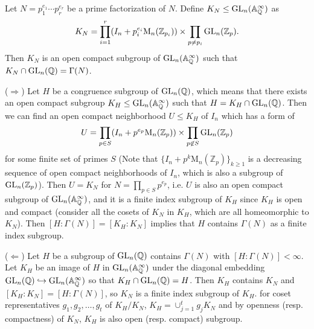 \begin{problem} \notfinish
\end{problem}

\begin{problem}
Let $N = p_{1}^{e_{1}}\cdots p_{r}^{e_r}$ be a prime factorization of $N$. Define $K_N \leq \operatorname{\mathrm{GL}}_{n}(\mathbb{A}_{\mathbb{Q}}^{\infty})$ as
$$
K_N = \prod_{i=1}^{r} (I_{n} + p_{i}^{e_{i}}\mathrm{M}_n(\mathbb{Z}_{p_i})) \times  \prod_{p \neq p_{i}} \operatorname{\mathrm{GL}}_{n}(\mathbb{Z}_p).
$$
Then $K_N$ is an open compact subgroup of $\operatorname{\mathrm{GL}}_{n}(\mathbb{A}_{\mathbb{Q}}^{\infty})$ such that $K_N \cap \operatorname{\mathrm{GL}}_{n}(\mathbb{Q}) = \Gamma(N)$.

($\Rightarrow$) Let $H$ be a congruence subgroup of $\operatorname{\mathrm{GL}}_{n}(\mathbb{Q})$, which means that there exists an open compact subgroup $K_H \leq \operatorname{\mathrm{GL}}_{n}(\mathbb{A}_{\mathbb{Q}}^{\infty})$
such that $H = K_H \cap \operatorname{\mathrm{GL}}_{n}(\mathbb{Q})$.
Then we can find an open compact neighborhood $U \leq K_H$ of $I_n$  which has a form of
$$
U = \prod_{p\in S} (I_n + p^{e_p}\mathrm{M}_n(\mathbb{Z}_p)) \times \prod_{p \not \in S} \operatorname{\mathrm{GL}}_n(\mathbb{Z}_p)
$$
for some finite set of primes $S$ (Note that $\{I_n + p^{k}\mathrm{M}_{n}(\mathbb{Z}_{p})\}_{k\geq 1}$ is a decreasing sequence of open compact neighborhoods of $I_n$, which is also a subgroup of $\operatorname{\mathrm{GL}}_{n}(\mathbb{Z}_p)$).
Then $U = K_N$ for $N = \prod_{p \in S}p^{e_p}$, i.e. $U$ is also an open compact subgroup of $\operatorname{\mathrm{GL}}_{n}(\mathbb{A}_{\mathbb{Q}}^{\infty})$, and it is a finite index subgroup of $K_H$
since $K_H$ is open and compact (consider all the cosets of $K_N$ in $K_H$, which are all homeomorphic to $K_N$).
Then $[H: \Gamma(N)] = [K_H: K_N]$ implies that $H$ contains $\Gamma(N)$ as a finite index subgroup.

($\Leftarrow$) 
Let $H$ be a subgroup of $\operatorname{\mathrm{GL}}_{n}(\mathbb{Q})$ contains $\Gamma(N)$ with $[H:\Gamma(N)] < \infty$.
Let $K_H$ be an image of $H$ in $\operatorname{\mathrm{GL}}_{n}(\mathbb{A}_{\mathbb{Q}}^{\infty})$ under the diagonal embedding $\operatorname{\mathrm{GL}}_{n}(\mathbb{Q}) \hookrightarrow \operatorname{\mathrm{GL}}_{n}(\mathbb{A}_{\mathbb{Q}}^{\infty})$
so that $K_H \cap \operatorname{\mathrm{GL}}_{n}(\mathbb{Q}) = H$.
Then $K_H$ contains $K_N$ and $[K_H: K_N] = [H:\Gamma(N)]$, so $K_N$ is a finite index subgroup of $K_H$.
for coset representatives $g_{1}, g_{2}, \dots, g_{t}$ of $K_{H} / K_{N}$, $K_{H} = \cup_{j=1}^{t} g_{j}K_{N}$ and by openness (resp. compactness) of $K_N$, $K_H$ is also open (resp. compact) subgroup.

\end{problem}